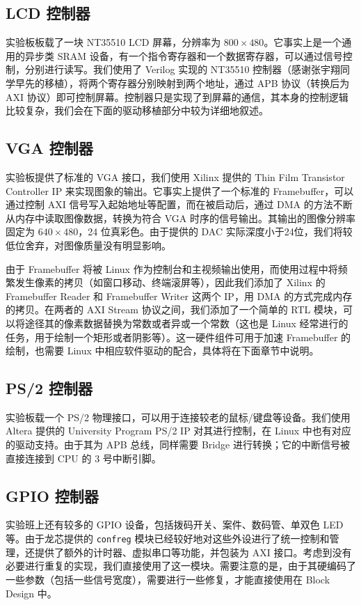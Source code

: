 \subsection{LCD 控制器}

实验板板载了一块 NT35510 LCD 屏幕，分辨率为 $800 \times 480$。它事实上是一个通用的异步类 SRAM 设备，有一个指令寄存器和一个数据寄存器，可以通过信号控制，分别进行读写。我们使用了 Verilog 实现的 NT35510 控制器（感谢张宇翔同学早先的移植），将两个寄存器分别映射到两个地址，通过 APB 协议（转换后为 AXI 协议）即可控制屏幕。控制器只是实现了到屏幕的通信，其本身的控制逻辑比较复杂，我们会在下面的驱动移植部分中较为详细地叙述。

\subsection{VGA 控制器}

实验板提供了标准的 VGA 接口，我们使用 Xilinx 提供的 Thin Film Transistor Controller IP 来实现图象的输出。它事实上提供了一个标准的 Framebuffer，可以通过控制 AXI 信号写入起始地址等配置，而在被启动后，通过 DMA 的方法不断从内存中读取图像数据，转换为符合 VGA 时序的信号输出。其输出的图像分辨率固定为 $640 \times 480$，24 位真彩色。由于提供的 DAC 实际深度小于24位，我们将较低位舍弃，对图像质量没有明显影响。

由于 Framebuffer 将被 Linux 作为控制台和主视频输出使用，而使用过程中将频繁发生像素的拷贝（如窗口移动、终端滚屏等），因此我们添加了 Xilinx 的 Framebuffer Reader 和 Framebuffer Writer 这两个 IP，用 DMA 的方式完成内存的拷贝。在两者的 AXI Stream 协议之间，我们添加了一个简单的 RTL 模块，可以将途径其的像素数据替换为常数或者异或一个常数（这也是 Linux 经常进行的任务，用于绘制一个矩形或者阴影等）。这一硬件组件可用于加速 Framebuffer 的绘制，也需要 Linux 中相应软件驱动的配合，具体将在下面章节中说明。

\subsection{PS/2 控制器}

实验板载一个 PS/2 物理接口，可以用于连接较老的鼠标/键盘等设备。我们使用 Altera 提供的 University Program PS/2 IP 对其进行控制，在 Linux 中也有对应的驱动支持。由于其为 APB 总线，同样需要 Bridge 进行转换；它的中断信号被直接连接到 CPU 的 3 号中断引脚。

\subsection{GPIO 控制器}

实验班上还有较多的 GPIO 设备，包括拨码开关、案件、数码管、单双色 LED 等。由于龙芯提供的 \texttt{confreg} 模块已经较好地对这些外设进行了统一控制和管理，还提供了额外的计时器、虚拟串口等功能，并包装为 AXI 接口。考虑到没有必要进行重复的实现，我们直接使用了这一模块。需要注意的是，由于其硬编码了一些参数（包括一些信号宽度），需要进行一些修复，才能直接使用在 Block Design 中。
